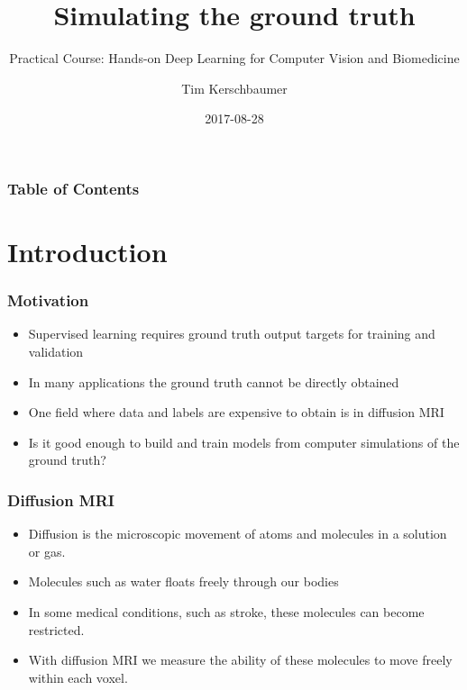 \documentclass{beamer}
\title[Simulating the ground truth] %
{Simulating the ground truth}
\subtitle{Practical Course: Hands-on Deep Learning for Computer Vision and Biomedicine}
\author[Tim Kerschbaumer] %
{Tim Kerschbaumer}
\institute[] %
{
  \inst{1}%
  Department of Informatics\\
  Technichal University of Munich
}
\date[2017-08-28] %
{2017-08-28}
\begin{document}
\frame{\titlepage}


\begin{frame}
\frametitle{Table of Contents}
\tableofcontents
\end{frame}


\section{Introduction}

\begin{frame}
\frametitle{Motivation}
\begin{itemize}
\item<1-> Supervised learning requires ground truth output targets for training and validation
\item<2-> In many applications the ground truth cannot be directly obtained
\item<3-> One field where data and labels are expensive to obtain is in diffusion MRI
\item<4-> Is it good enough to build and train models from computer simulations of the ground truth?
\end{itemize}
\end{frame}

\begin{frame}
\frametitle{Diffusion MRI}
\begin{itemize}
\item<1->Diffusion is the microscopic movement of atoms and molecules in a solution or gas.
\item<2->Molecules such as water floats freely through our bodies
\item<3->In some medical conditions, such as stroke, these molecules can become restricted.
\item<4->With diffusion MRI we measure the ability of these molecules to move freely within each voxel.
\end{itemize}
\end{frame}
\end{document}
